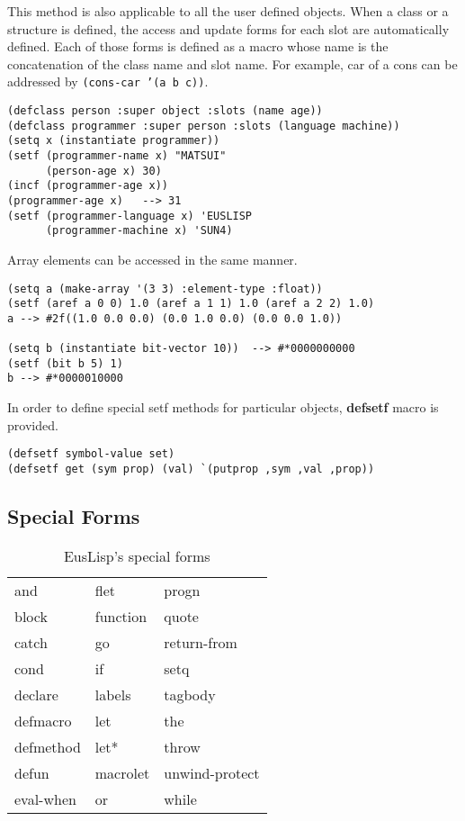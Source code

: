This method is also applicable to all the user defined objects.
When a class or a structure is defined, the access and update forms
for each slot are automatically defined.
Each of those forms is defined as a macro whose name is the concatenation of
the class name and slot name.
For example, car of a cons can be addressed by {\tt (cons-car '(a b c))}.

\begin{verbatim}
(defclass person :super object :slots (name age))
(defclass programmer :super person :slots (language machine))
(setq x (instantiate programmer))
(setf (programmer-name x) "MATSUI"
      (person-age x) 30)
(incf (programmer-age x))
(programmer-age x)   --> 31
(setf (programmer-language x) 'EUSLISP
      (programmer-machine x) 'SUN4)
\end{verbatim}

Array elements can be accessed in the same manner.

\begin{verbatim}
(setq a (make-array '(3 3) :element-type :float))
(setf (aref a 0 0) 1.0 (aref a 1 1) 1.0 (aref a 2 2) 1.0)
a --> #2f((1.0 0.0 0.0) (0.0 1.0 0.0) (0.0 0.0 1.0))

(setq b (instantiate bit-vector 10))  --> #*0000000000
(setf (bit b 5) 1)
b --> #*0000010000
\end{verbatim}

In order to define special setf methods for particular objects,
{\bf defsetf} macro is provided.

\begin{verbatim}
(defsetf symbol-value set)
(defsetf get (sym prop) (val) `(putprop ,sym ,val ,prop))
\end{verbatim}

\subsection{Special Forms}

\begin{table}
\begin{center}
{\large
\begin{tabular}{|l l l|} \hline 
and & flet & progn \\
block & function & quote\\
catch & go & return-from\\
cond & if & setq\\
declare & labels & tagbody\\
defmacro & let & the\\
defmethod & let* & throw\\
defun & macrolet & unwind-protect\\
eval-when & or & while\\
\hline
\end{tabular} }
\end{center}
\caption{\label{SpecialForms}EusLisp's special forms}
\end{table}

